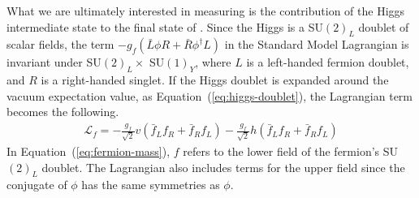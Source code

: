 What we are ultimately interested in measuring is the contribution of the
Higgs intermediate state to the final state of \bb.
Since the Higgs is a SU$(2)_L$ doublet of scalar fields,
the term $-g_f(\bar{L}\phi R + \bar{R} \phi^\dagger L)$ in the
Standard Model Lagrangian is invariant under SU$(2)_L \times$ SU$(1)_Y$,
where $L$ is a left-handed fermion doublet, and $R$ is a right-handed singlet.
If the Higgs doublet is expanded around the vacuum expectation value,
as Equation~(\ref{eq:higgs-doublet}), the Lagrangian term becomes the following.
\begin{gather}
  \mathcal{L}_f =
  -\frac{g_f}{\sqrt2} v \left(\bar{f}_L f_R + \bar{f}_R f_L \right)
  -\frac{g_f}{\sqrt2} h \left(\bar{f}_L f_R + \bar{f}_R f_L \right)
  \label{eq:fermion-mass}
\end{gather}
In Equation~(\ref{eq:fermion-mass}),
$f$ refers to the lower field of the fermion's SU$(2)_L$ doublet.
The Lagrangian also includes terms for the upper field since the conjugate of $\phi$
has the same symmetries as $\phi$.

